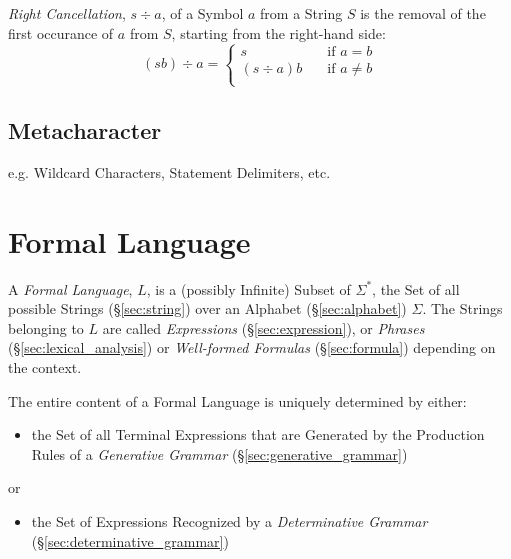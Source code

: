 \emph{Right Cancellation}, $s \div a$, of a Symbol $a$ from a String
$S$ is the removal of the first occurance of $a$ from $S$, starting
from the right-hand side:
\[
  (sb) \div a =
  \begin{cases}
    s           & \quad \text{if $a = b$}\\
    (s \div a)b & \quad \text{if $a \neq b$}\\
  \end{cases}
\]



\subsection{Metacharacter}\label{sec:metacharacter}


e.g. Wildcard Characters, Statement Delimiters, etc.



\section{Formal Language}\label{sec:formal_language}

A \emph{Formal Language}, $L$, is a (possibly Infinite) Subset of
$\Sigma^*$, the Set of all possible Strings (\S\ref{sec:string}) over
an Alphabet (\S\ref{sec:alphabet}) $\Sigma$. The Strings belonging to
$L$ are called \emph{Expressions} (\S\ref{sec:expression}), or
\emph{Phrases} (\S\ref{sec:lexical_analysis}) or \emph{Well-formed
  Formulas} (\S\ref{sec:formula}) depending on the context.

The entire content of a Formal Language is uniquely determined by
either:
\begin{itemize}
  \item the Set of all Terminal Expressions that are Generated by the
    Production Rules of a \emph{Generative Grammar}
    (\S\ref{sec:generative_grammar})
\end{itemize}
or
\begin{itemize}
  \item the Set of Expressions Recognized by a \emph{Determinative
    Grammar} (\S\ref{sec:determinative_grammar})
\end{itemize}

